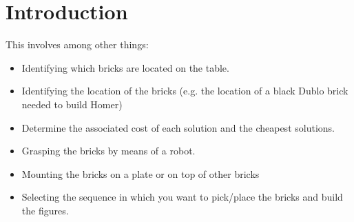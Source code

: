 \chapter{Introduction}\label{chap:introduction}

This involves among other things:
\begin{itemize}
    \item Identifying which bricks are located on the table.
    \item Identifying the location of the bricks (e.g. the location of a black Dublo brick needed to build Homer)
    \item Determine the associated cost of each solution and the cheapest solutions.
    \item Grasping the bricks by means of a robot.
    \item Mounting the bricks on a plate or on top of other bricks
    \item Selecting the sequence in which you want to pick/place the bricks and build the figures.
\end{itemize}